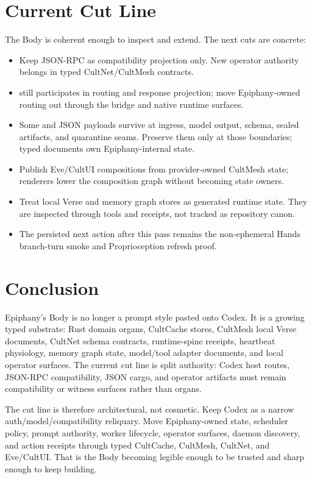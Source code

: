 \documentclass[11pt]{article}
\begin{document}
\section{Current Cut Line}

The Body is coherent enough to inspect and extend. The next cuts are concrete:

\begin{itemize}
  \item Keep  JSON-RPC as compatibility projection
  only. New operator authority belongs in typed CultNet/CultMesh contracts.
  \item {} still participates in routing and
  response projection; move Epiphany-owned routing out through the bridge and
  native runtime surfaces.
  \item Some  and JSON payloads survive at ingress,
  model output, schema, sealed artifacts, and quarantine seams. Preserve them
  only at those boundaries; typed documents own Epiphany-internal state.
  \item Publish Eve/CultUI compositions from provider-owned CultMesh state;
  renderers lower the composition graph without becoming state owners.
  \item Treat local Verse and memory graph stores as generated runtime state.
  They are inspected through tools and receipts, not tracked as repository
  canon.
  \item The persisted next action after this pass remains the non-ephemeral
  Hands branch-turn smoke and Proprioception refresh proof.
\end{itemize}

\section{Conclusion}

Epiphany's Body is no longer a prompt style pasted onto Codex. It is a growing
typed substrate: Rust domain organs, CultCache stores, CultMesh local Verse
documents, CultNet schema contracts, runtime-spine receipts, heartbeat
physiology, memory graph state, model/tool adapter documents, and local
operator surfaces. The current cut line is split authority: Codex host routes,
JSON-RPC compatibility, JSON cargo, and operator artifacts must remain
compatibility or witness surfaces rather than organs.

The cut line is therefore architectural, not cosmetic. Keep Codex as a
narrow auth/model/compatibility reliquary. Move Epiphany-owned state, scheduler
policy, prompt authority, worker lifecycle, operator surfaces, daemon discovery,
and action receipts through typed CultCache, CultMesh, CultNet, and Eve/CultUI.
That is the Body becoming legible enough to be trusted and sharp enough to keep
building.
\end{document}
